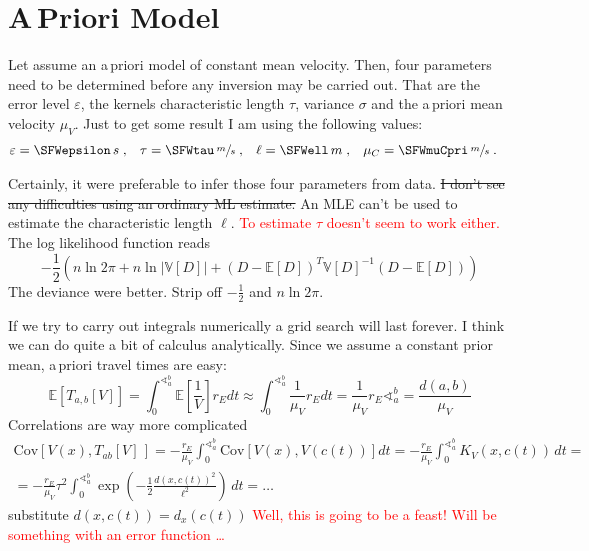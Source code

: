 \documentclass[11pt]{article}
\newcommand\worries[1]{\textcolor{red}{#1}}
\newcommand\Mean[1]{\mathbb{E}\!\left[#1\right]}
\newcommand\Var[1]{\mathbb{V}\!\left[#1\right]}
\newcommand\Cov[2]{\mathrm{Cov}\!\left[#1,#2\right]}
\begin{document}
\section{A\,Priori Model}

Let assume an a\,priori model of constant mean velocity.
Then, four parameters need to be determined before any inversion may be carried out.
That are the error level $\varepsilon$, the kernels characteristic length $\tau$, variance $\sigma$ and the a\,priori mean velocity $\mu_V$.
Just to get some result I am using the following values:
\begin{align}\label{eq:parameters}
    \varepsilon &= \SFWepsilon \, s \;,&
    \tau &= \SFWtau \, \sfrac ms \;,&
    \ell &= \SFWell \, m \;,&
    \mu_C &= \SFWmuCpri \, \sfrac ms \;.
\end{align}

Certainly, it were preferable to infer those four parameters from data.
\st{I don't see any difficulties using an ordinary ML estimate.}
An MLE can't be used to estimate the characteristic length $\ell$.
\worries{To estimate $\tau$ doesn't seem to work either.}
The log likelihood function reads
\begin{equation}
    -\frac 12 \left( n \ln 2\pi + n \ln |\Var D| + (D - \Mean D)^T \Var{D}^{-1} (D - \Mean D) \right)
\end{equation}
The deviance were better. Strip off $-\frac12$ and $n\ln2\pi$.

If we try to carry out integrals numerically a grid search will last forever.
I think we can do quite a bit of calculus analytically.
Since we assume a constant prior mean, a\,priori travel times are easy:
\begin{equation}
    \Mean{T_{a,b}[V]}
    = \int_0^{\sphericalangle_a^b} \Mean{\frac1V} r_E d t
    \approx \int_0^{\sphericalangle_a^b} \frac1{\mu_V} r_E d t
    = \frac1{\mu_V} r_E \sphericalangle_a^b
    = \frac{d(a,b)}{\mu_V}
\end{equation}
Correlations are way more complicated
\begin{multline}
    \Cov{V(x)}{T_{ab}[V]\,} =
   -\frac{r_E}{\mu_V} \int_0^{\sphericalangle_a^b} \Cov{V(x)}{V(c(t))} d t =
   -\frac{r_E}{\mu_V} \int_0^{\sphericalangle_a^b} K_V(x,c(t))\, d t =
   \\ =
   -\frac{r_E}{\mu_V} \tau^2 \int_0^{\sphericalangle_a^b} \exp\!\left(-\frac 12 \frac{d(x,c(t))^2}{\ell^2}\right)\, d t = \dots
\end{multline}
substitute $d(x,c(t)) = d_x(c(t))$
\worries{Well, this is going to be a feast! Will be something with an error function \dots }
\end{document}
